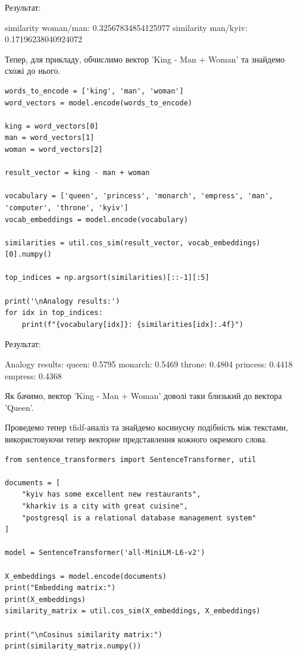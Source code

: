 Результат:

\begin{console}
similarity woman/man: 0.32567834854125977
similarity man/kyiv: 0.17196238040924072
\end{console}

Тепер, для прикладу, обчислимо вектор 'King - Man + Woman' та знайдемо схожі до нього.

\begin{lstlisting}
words_to_encode = ['king', 'man', 'woman']
word_vectors = model.encode(words_to_encode)

king = word_vectors[0]
man = word_vectors[1]
woman = word_vectors[2]

result_vector = king - man + woman

vocabulary = ['queen', 'princess', 'monarch', 'empress', 'man', 'computer', 'throne', 'kyiv']
vocab_embeddings = model.encode(vocabulary)

similarities = util.cos_sim(result_vector, vocab_embeddings)[0].numpy()

top_indices = np.argsort(similarities)[::-1][:5]

print('\nAnalogy results:')
for idx in top_indices:
    print(f"{vocabulary[idx]}: {similarities[idx]:.4f}")
\end{lstlisting}

Результат:

\begin{console}
Analogy results:
queen: 0.5795
monarch: 0.5469
throne: 0.4804
princess: 0.4418
empress: 0.4368
\end{console}

Як бачимо, вектор 'King - Man + Woman' доволі таки близький до вектора 'Queen'.

Проведемо тепер tfidf-аналіз та знайдемо косинусну подібність між текстами, використовуючи тепер векторне представлення кожного окремого слова.

\begin{lstlisting}
from sentence_transformers import SentenceTransformer, util

documents = [
    "kyiv has some excellent new restaurants",
    "kharkiv is a city with great cuisine",
    "postgresql is a relational database management system"
]

model = SentenceTransformer('all-MiniLM-L6-v2')

X_embeddings = model.encode(documents)
print("Embedding matrix:")
print(X_embeddings)
similarity_matrix = util.cos_sim(X_embeddings, X_embeddings)

print("\nCosinus similarity matrix:")
print(similarity_matrix.numpy())
\end{lstlisting}

